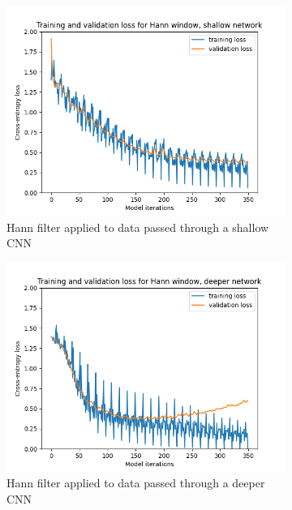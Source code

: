 \documentclass[class=report,11pt,crop=false]{standalone}
\begin{document}
\begin{figure}[hbt!]
    \begin{subfigure}[b]{0.5\textwidth}
        \includegraphics[width=\linewidth]{Images/hannSimple.png}
        \caption{Hann filter applied to data passed through a shallow CNN}
        \label{fig:HannShallow}
    \end{subfigure}
    \hfill
    \begin{subfigure}[b]{0.5\textwidth}
        \includegraphics[width=\linewidth]{Images/hannComplex.png}
        \caption{Hann filter applied to data passed through a deeper CNN}
        \label{fig:HannDeeper}
    \end{subfigure}
    \hfill
    \begin{subfigure}[b]{0.5\textwidth}

\end{subfigure}
\end{figure}
\end{document}
